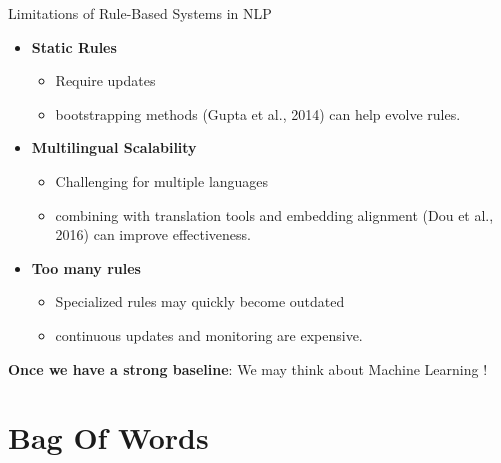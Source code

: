 \documentclass{beamer}
\newenvironment{stepitemize}{\begin{itemize}[<+->]}{\end{itemize} }
\begin{document}
\begin{frame}{Limitations of Rule-Based Systems in NLP}

\begin{stepitemize}
  \item \textbf{Static Rules}
    \begin{itemize}
      \item Require updates
      \item bootstrapping methods (Gupta et al., 2014) can help evolve rules.
    \end{itemize}

  \item \textbf{Multilingual Scalability}
    \begin{itemize}
      \item Challenging for multiple languages
      \item combining with translation tools and embedding alignment (Dou et al., 2016) can improve effectiveness.
    \end{itemize}

  \item \textbf{Too many rules}
    \begin{itemize}
      \item Specialized rules may quickly become outdated
      \item continuous updates and monitoring are expensive.
    \end{itemize}
\end{stepitemize}
\newline
\pause
\textbf{Once we have a strong baseline}: We may think about Machine Learning !

\end{frame}

\section{Bag Of Words}
\end{document}
